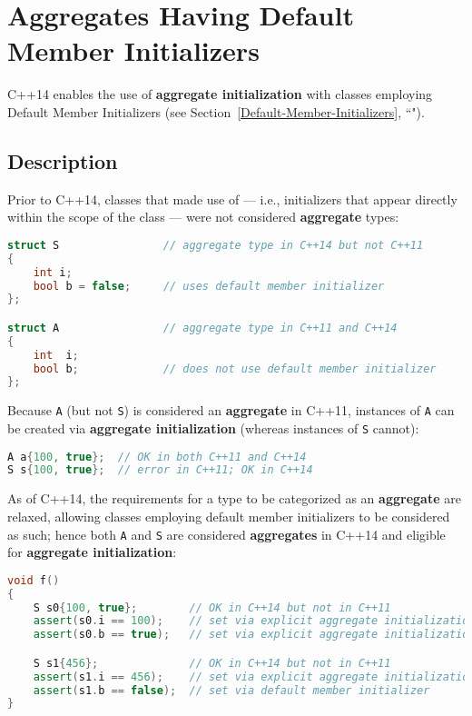 \newpage
{}
\section[Aggregate Init '14]{Aggregates Having Default Member Initializers}\label{aggregate-member-initialization-relaxation}

C++14 enables the use of \textbf{aggregate initialization} with classes
employing Default Member Initializers (see Section~\ref{Default-Member-Initializers}, ``").

\subsection[Description]{Description}\label{description}

Prior to C++14, classes that made use of  --- i.e., initializers that appear directly within the
scope of the class --- were not considered \textbf{aggregate} types:

\begin{lstlisting}[language=C++]
struct S                // aggregate type in C++14 but not C++11
{
    int i;
    bool b = false;     // uses default member initializer
};

struct A                // aggregate type in C++11 and C++14
{
    int  i;
    bool b;             // does not use default member initializer
};
\end{lstlisting}

\noindent Because \texttt{A} (but not \texttt{S}) is considered an \textbf{aggregate} in
C++11, instances of \texttt{A} can be created via \textbf{aggregate
initialization} (whereas instances of \texttt{S} cannot):

\begin{lstlisting}[language=C++]
A a{100, true};  // OK in both C++11 and C++14
S s{100, true};  // error in C++11; OK in C++14
\end{lstlisting}


\noindent As of C++14, the requirements for a type to be categorized as an
\textbf{aggregate} are relaxed, allowing classes employing default
member initializers to be considered as such; hence both \texttt{A} and
\texttt{S} are considered \textbf{aggregates} in C++14 and eligible for
\textbf{aggregate initialization}:

\begin{lstlisting}[language=C++]
void f()
{
    S s0{100, true};        // OK in C++14 but not in C++11
    assert(s0.i == 100);    // set via explicit aggregate initialization (above)
    assert(s0.b == true);   // set via explicit aggregate initialization (above)

    S s1{456};              // OK in C++14 but not in C++11
    assert(s1.i == 456);    // set via explicit aggregate initialization (above)
    assert(s1.b == false);  // set via default member initializer
}
\end{lstlisting}

